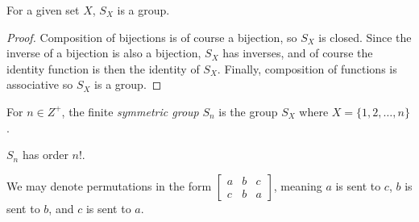 \documentclass[12pt]{article}
\begin{document}
\begin{prop}\label{permutations-group}
    For a given set $X$, $S_X$ is a group.
\end{prop}

\begin{proof}
    Composition of bijections is of course a bijection, so $S_X$ is closed. Since the inverse of a bijection is also a bijection, $S_X$ has inverses, and of course the identity function is then the identity of $S_X$. Finally, composition of functions is associative so $S_X$ is a group.
\end{proof}

\begin{defn}
    For $n \in Z^+$, the finite \emph{symmetric group} $S_n$ is the group $S_X$ where $X = \{1, 2, \ldots, n\}$.
\end{defn}

\begin{rmk}
    $S_n$ has order $n!$.
\end{rmk}

\begin{rmk}
    We may denote permutations in the form
    $\begin{bmatrix}
        a & b & c \\ c & b & a
    \end{bmatrix}$, meaning $a$ is sent to $c$, $b$ is sent to $b$, and $c$ is sent to $a$.
\end{rmk}
\end{document}
